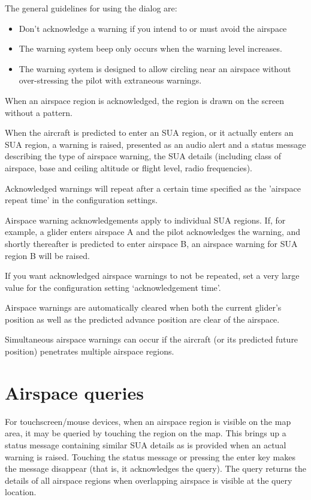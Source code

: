 \documentclass[a4paper,12pt]{refrep}
\begin{document}
The general guidelines for using the dialog are:
\begin{itemize}
\item Don't acknowledge a warning if you intend to or must avoid the airspace
\item The warning system beep only occurs when the warning level increases.
\item The warning system is designed to allow circling near an airspace without
  over-stressing the pilot with extraneous warnings.
\end{itemize}

When an airspace region is acknowledged, the region is drawn on the
screen without a pattern.

When the aircraft is predicted to enter an SUA region, or it actually
enters an SUA region, a warning is raised, presented as an audio alert
and a status message describing the type of airspace warning, the SUA
details (including class of airspace, base and ceiling altitude or
flight level, radio frequencies).


Acknowledged warnings will repeat after a certain time specified as
the 'airspace repeat time' in the configuration settings.

Airspace warning acknowledgements apply to individual SUA regions.
If, for example, a glider enters airspace A and the pilot acknowledges
the warning, and shortly thereafter is predicted to enter airspace B,
an airspace warning for SUA region B will be raised.

\tip If you want acknowledged airspace warnings to not be repeated,
set a very large value for the configuration setting `acknowledgement
time'.

Airspace warnings are automatically cleared when both the current
glider's position as well as the predicted advance position are clear
of the airspace.

Simultaneous airspace warnings can occur if the aircraft (or its
predicted future position) penetrates multiple airspace regions.

\section{Airspace queries}

For touchscreen/mouse devices, when an airspace region is visible on
the map area, it may be queried by touching the region on the map.
This brings up a status message containing similar SUA details as is
provided when an actual warning is raised.  Touching the status
message or pressing the enter key makes the message disappear (that
is, it acknowledges the query).  The query returns the details of all
airspace regions when overlapping airspace is visible at the query
location.
\end{document}
